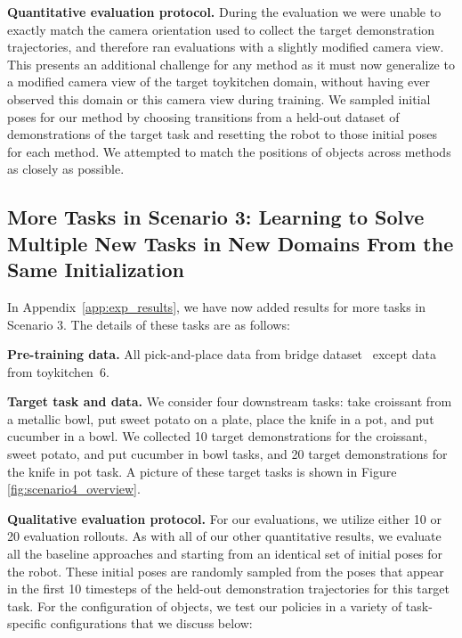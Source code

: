 \documentclass[../thesis.tex]{subfiles}
\begin{document}
\textbf{Quantitative evaluation protocol.} During the evaluation we were unable to exactly match the camera orientation used to collect the target demonstration trajectories, and therefore ran evaluations with a slightly modified camera view. This presents an additional challenge for any method as it must now generalize to a modified camera view of the target toykitchen domain, without having ever observed this domain or this camera view during training. We sampled initial poses for our method by choosing transitions from a held-out dataset of demonstrations of the target task and resetting the robot to those initial poses for each method. We attempted to match the positions of objects across methods as closely as possible.

\subsection{More Tasks in Scenario 3: Learning to Solve Multiple New Tasks in New Domains From the Same Initialization}
\label{app:scenario4}

In Appendix~\ref{app:exp_results}, we have now added results for more tasks in Scenario 3. The details of these tasks are as follows:

\textbf{Pre-training data.} All pick-and-place data from bridge dataset~\citep{ebert2021bridge} except data from toykitchen~6.

\textbf{Target task and data.} We consider four downstream tasks: take croissant from a metallic bowl, put sweet potato on a plate, place the knife in a pot, and put cucumber in a bowl. We collected 10 target demonstrations for the croissant, sweet potato, and put cucumber in bowl tasks, and 20 target demonstrations for the knife in pot task. A picture of these target tasks is shown in Figure \ref{fig:scenario4_overview}.

\textbf{Qualitative evaluation protocol.} For our evaluations, we utilize either 10 or 20 evaluation rollouts. As with all of our other quantitative results, we evaluate all the baseline approaches and \ptrmethodname starting from an identical set of initial poses for the robot. These initial poses are randomly sampled from the poses that appear in the first 10 timesteps of the held-out demonstration trajectories for this target task. For the configuration of objects, we test our policies in a variety of task-specific configurations that we discuss below:
\end{document}
